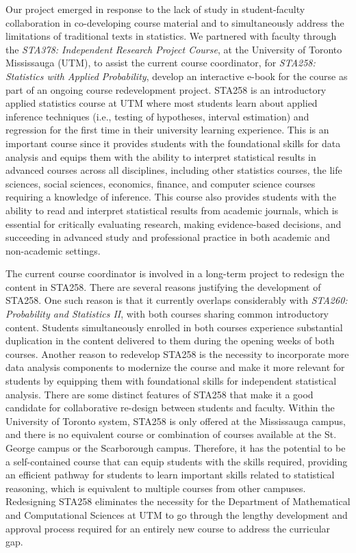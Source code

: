 \documentclass[11pt]{article}
\begin{document}
Our project emerged in response to the lack of study in student-faculty collaboration in co-developing course material and to simultaneously address the limitations of traditional texts in statistics. 
We partnered with faculty through the \textit{STA378: Independent Research Project Course}, at the University of Toronto Mississauga (UTM), to assist the current course coordinator, for \textit{STA258: Statistics with Applied Probability}, develop an interactive e-book for the course as part of an ongoing course redevelopment project.
STA258 is an introductory applied statistics course at UTM where most students learn about applied inference techniques (i.e., testing of hypotheses, interval estimation) and regression for the first time in their university learning experience.
This is an important course since it provides students with the foundational skills for data analysis and equips them with the ability to interpret statistical results in advanced courses across all disciplines, including other statistics courses, the life sciences, social sciences, economics, finance, and computer science courses requiring a knowledge of inference.
This course also provides students with the ability to read and interpret statistical results from academic journals, which is essential for critically evaluating research, making evidence-based decisions, and succeeding in advanced study and professional practice in both academic and non-academic settings.

The current course coordinator is involved in a long-term project to redesign the content in STA258. 
There are several reasons justifying the development of STA258.
One such reason is that it currently overlaps considerably with \textit{STA260: Probability and Statistics II}, with both courses sharing common introductory content.
Students simultaneously enrolled in both courses experience substantial duplication in the content delivered to them during the opening weeks of both courses.
Another reason to redevelop STA258 is the necessity to incorporate more data analysis components to modernize the course and make it more relevant for students by equipping them with foundational skills for independent statistical analysis.
There are some distinct features of STA258 that make it a good candidate for collaborative re-design between students and faculty.
Within the University of Toronto system, STA258 is only offered at the Mississauga campus, and there is no equivalent course or combination of courses available at the St. George campus or the Scarborough campus.
Therefore, it has the potential to be a self-contained course that can equip students with the skills required, providing an efficient pathway for students to learn important skills related to statistical reasoning, which is equivalent to multiple courses from other campuses.
Redesigning STA258 eliminates the necessity for the Department of Mathematical and Computational Sciences at UTM to go through the lengthy development and approval process required for an entirely new course to address the curricular gap.
\end{document}
